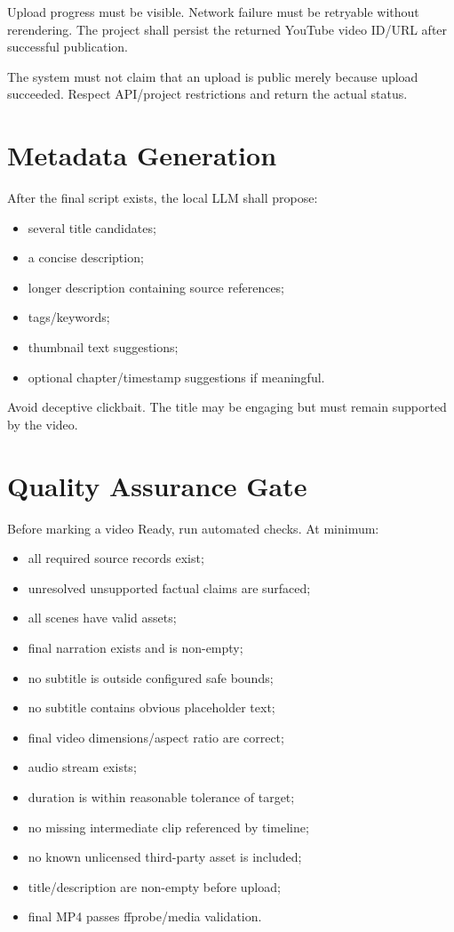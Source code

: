 \documentclass[10pt,journal,compsoc]{IEEEtran}
\begin{document}
Upload progress must be visible. Network failure must be retryable without rerendering. The project shall persist the returned YouTube video ID/URL after successful publication.

The system must not claim that an upload is public merely because upload succeeded. Respect API/project restrictions and return the actual status.

\section{Metadata Generation}

After the final script exists, the local LLM shall propose:
\begin{itemize}
    \item several title candidates;
    \item a concise description;
    \item longer description containing source references;
    \item tags/keywords;
    \item thumbnail text suggestions;
    \item optional chapter/timestamp suggestions if meaningful.
\end{itemize}

Avoid deceptive clickbait. The title may be engaging but must remain supported by the video.

\section{Quality Assurance Gate}

Before marking a video Ready, run automated checks. At minimum:
\begin{itemize}
    \item all required source records exist;
    \item unresolved unsupported factual claims are surfaced;
    \item all scenes have valid assets;
    \item final narration exists and is non-empty;
    \item no subtitle is outside configured safe bounds;
    \item no subtitle contains obvious placeholder text;
    \item final video dimensions/aspect ratio are correct;
    \item audio stream exists;
    \item duration is within reasonable tolerance of target;
    \item no missing intermediate clip referenced by timeline;
    \item no known unlicensed third-party asset is included;
    \item title/description are non-empty before upload;
    \item final MP4 passes ffprobe/media validation.
\end{itemize}
\end{document}
